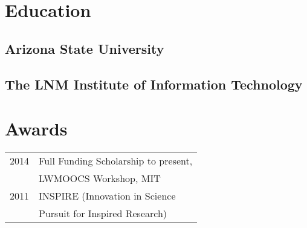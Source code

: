 \documentclass[hidelinks,letterpaper]{deedy-resume-openfont} %
\begin{document}
\begin{minipage}[t]{0.33\textwidth} %


\section{Education} 

\subsection{Arizona State University}


\sectionsep %

\subsection{The LNM Institute of Information Technology}


\section{Awards} 
\begin{tabular}{rl}
2014     & \small Full Funding Scholarship to present, \\
         & \small LWMOOCS Workshop, MIT\\
2011     & \small INSPIRE (Innovation in Science \\
         & \small Pursuit for Inspired Research)\\

\end{tabular}



\end{minipage}
\end{document}
